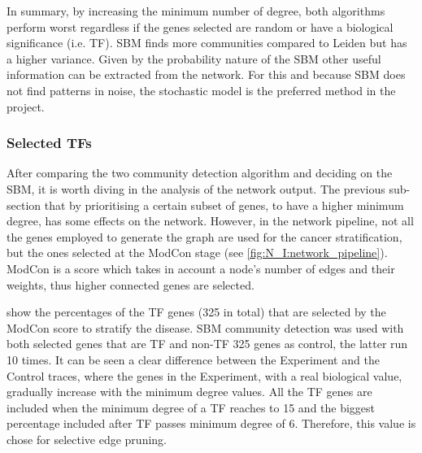 In summary, by increasing the minimum number of degree, both algorithms perform worst regardless if the genes selected are random or have a biological significance (i.e. TF). SBM finds more communities compared to Leiden but has a higher variance. Given by the probability nature of the SBM other useful information can be extracted from the network. For this and because SBM does not find patterns in noise, the stochastic model is the preferred method in the project.



\subsubsection{Selected TFs} \label{s:sel_tfs}


After comparing the two community detection algorithm and deciding on the SBM, it is worth diving in the analysis of the network output. The previous sub-section that by prioritising a certain subset of genes, to have a higher minimum degree, has some effects on the network. However, in the network pipeline, not all the genes employed to generate the graph are used for the cancer stratification, but the ones selected at the ModCon stage (see \cref{fig:N_I:network_pipeline}). ModCon is a score which takes in account a node's number of edges and their weights, thus higher connected genes are selected.

 show the percentages of the TF genes (325 in total) that are selected by the ModCon score to stratify the disease. SBM community detection was used with both selected genes that are TF and non-TF 325 genes as control, the latter run 10 times. It can be seen a clear difference between the Experiment and the Control traces, where the genes in the Experiment, with a real biological value, gradually increase with the minimum degree values. All the TF genes are included when the minimum degree of a TF reaches to 15 and the biggest percentage included after TF passes minimum degree of 6. Therefore, this value is chose for selective edge pruning.


